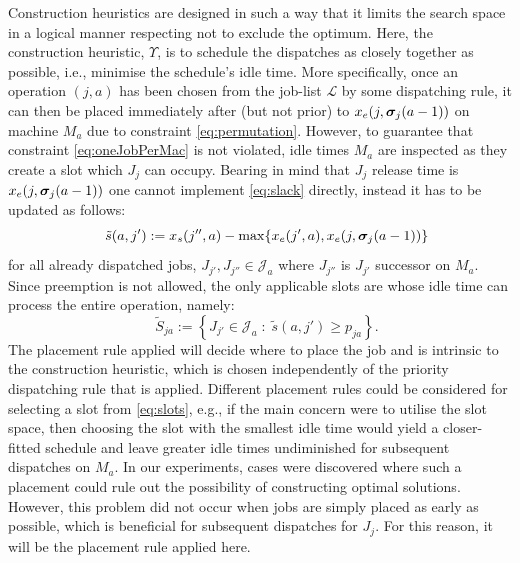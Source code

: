 \documentclass[twocolumn]{svjour3}
\begin{document}
Construction heuristics are designed in such a way that it limits the search 
space in a logical manner respecting not to exclude the optimum. Here, the 
construction heuristic, $\Upsilon$, is to schedule the dispatches as closely 
together as possible, i.e., minimise the schedule's idle time. 
More specifically, once an operation $(j,a)$ has been chosen from the job-list 
$\mathcal{L}$ by some dispatching rule, it can then be placed immediately after 
(but not prior) to $x_e(j,\bm \sigma_j(a-1))$ on machine $M_a$ due to constraint 
\cref{eq:permutation}. 
However, to guarantee that constraint \cref{eq:oneJobPerMac} is not violated, 
idle times $M_a$ are inspected as they create a slot which $J_j$ can 
occupy. Bearing in mind that $J_j$ release time is $x_e(j,\bm \sigma_j(a-1))$ one 
cannot implement \cref{eq:slack} directly, instead it has to be updated as 
follows:
\begin{equation}\quad
\tilde{s}(a,j'):= x_s(j'',a)-\max\{x_e(j',a),x_e(j,\vsigma_j(a-1))\} %
\end{equation}
for all already dispatched jobs, $J_{j'},J_{j''}\in \mathcal{J}_a$ where 
$J_{j''}$ is $J_{j'}$ successor on $M_a$. Since preemption is not allowed, the 
only applicable slots are whose idle time can process the entire operation, 
namely:
\begin{equation}\quad
\tilde{S}_{ja} := \left\{J_{j'}\in \mathcal{J}_a \;:\; \tilde{s}(a,j')\geq 
p_{ja} 
\right\}\label{eq:slots}.
\end{equation} 
The placement rule applied will decide where to place the job and is intrinsic 
to the construction heuristic, which is chosen independently of the priority 
dispatching rule that is applied. 
Different placement rules could be considered for selecting a slot from 
\cref{eq:slots}, e.g., if the main concern were to utilise the slot space, then 
choosing the slot with the smallest idle time would yield a closer-fitted 
schedule and leave greater idle times undiminished for subsequent dispatches 
on $M_a$.
In our experiments, cases were discovered where such a placement could rule out 
the possibility of constructing optimal solutions.
However, this problem did not occur when jobs are simply placed as early as 
possible, which is beneficial for subsequent dispatches for $J_j$. 
For this reason, it will be the placement rule applied here.
\end{document}
